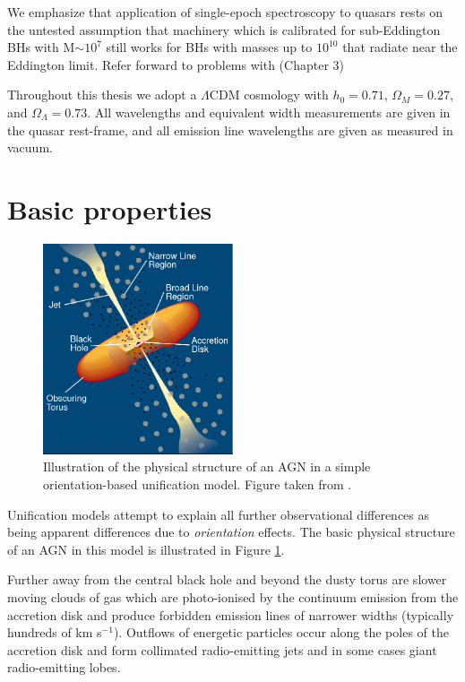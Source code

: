 We emphasize that application of single-epoch spectroscopy to quasars rests on the untested assumption that machinery which is calibrated for sub-Eddington BHs with M$\sim10^7$ still works for BHs with masses up to $10^{10}$ that radiate near the Eddington limit. 
Refer forward to problems with  (Chapter 3)


Throughout this thesis we adopt a $\Lambda$CDM cosmology with $h_0=0.71$, $\Omega_M=0.27$, and $\Omega_\Lambda=0.73$. 
All wavelengths and equivalent width measurements are given in the quasar rest-frame, and all emission line wavelengths are given as measured in vacuum.

\section{Basic properties}

\begin{figure}
  \centering
  \includegraphics[width=0.5\textwidth]{figures/chapter05/urry_model}
  \caption[{Illustration of the physical structure of an AGN in a simple orientation-based unification model.}]{Illustration of the physical structure of an AGN in a simple orientation-based unification model. Figure taken from \citet{urry95}.}
  \label{fig:agnmodel}
\end{figure}

Unification models attempt to explain all further observational differences as being apparent differences due to {\it orientation} effects. 
The basic physical structure of an AGN in this model is illustrated in Figure \ref{fig:agnmodel}. 

Further away from the central black hole and beyond the dusty torus are slower moving clouds of gas which are photo-ionised by the continuum emission from the accretion disk and produce forbidden emission lines of narrower widths (typically hundreds of km s$^{-1}$). 
Outflows of energetic particles occur along the poles of the accretion disk and form collimated radio-emitting jets and in some cases giant radio-emitting lobes. 

